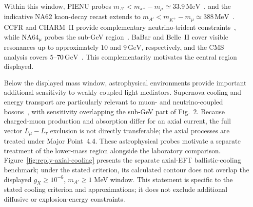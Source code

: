 \documentclass[12pt,a4paper]{article}
\begin{document}
\medskip
{}

Within this window, PIENU probes \(m_{A'}<m_{\pi^+}-m_\mu\simeq33.9\,\mathrm{MeV}\)~\cite{PIENU:2021clt,Altmannshofer:2026opc}, and the indicative NA62 kaon-decay recast extends to \(m_{A'}<m_{K^+}-m_\mu\simeq388\,\mathrm{MeV}\)~\cite{NA62:2021bji}. CCFR and CHARM~II provide complementary neutrino-trident constraints~\cite{CCFR:1991lpl,geiregat1990first}, while NA64\(_\mu\) probes the sub-GeV region~\cite{NA64:2024nwj}. BaBar and Belle~II cover visible resonances up to approximately \(10\) and \(9\,\mathrm{GeV}\), respectively, and the CMS analysis covers \(5\)--\(70\,\mathrm{GeV}\)~\cite{BaBar:2016sci,Belle-II:2024wtd,CMS:2018yxg}. This complementarity motivates the central region displayed.

\medskip
{}

Below the displayed mass window, astrophysical environments provide important additional sensitivity to weakly coupled light mediators. Supernova cooling and energy transport are particularly relevant to muon- and neutrino-coupled bosons~\cite{Blinov:2025aha,Wang:2026supernova}, with sensitivity overlapping the sub-GeV part of Fig.~2. Because charged-muon production and absorption differ for an axial current, the full vector \(L_\mu-L_\tau\) exclusion is not directly transferable; the axial processes are treated under Major Point~4.4. These astrophysical probes motivate a separate treatment of the lower-mass region alongside the laboratory comparison. Figure~\ref{fig:reply-axial-cooling} presents the separate axial-EFT ballistic-cooling benchmark; under the stated criterion, its calculated contour does not overlap the displayed \(g_X\geq10^{-6}\), \(m_{A'}\geq1\) MeV window. This statement is specific to the stated cooling criterion and approximations; it does not exclude additional diffusive or explosion-energy constraints.
\end{document}
